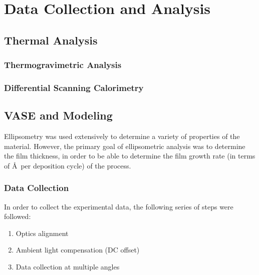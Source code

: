\chapter{Data Collection and Analysis}
\label{ch:Methods}
\thispagestyle{empty}



\section{Thermal Analysis}
\label{sec:Methods-Thermal}




\subsection{Thermogravimetric Analysis}



\subsection{Differential Scanning Calorimetry}



\section{VASE and Modeling}
\label{sec:Methods-Ellip}

Ellipsometry was used extensively to determine a variety of properties of the material. However, the primary goal of ellipsometric analysis was to determine the film thickness, in order to be able to determine the film growth rate (in terms of \AA\ per deposition cycle) of the process. 


\subsection{Data Collection}

In order to collect the experimental data, the following series of steps were followed:

\begin{enumerate}
	\item
	Optics alignment
	\item
	Ambient light compensation (DC offset)
	\item
	Data collection at multiple angles
\end{enumerate}

